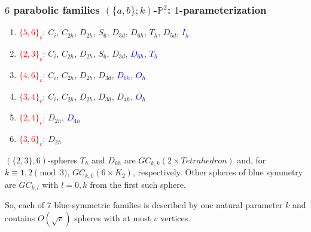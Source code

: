 \documentclass{beamer}
\begin{document}
\begin{frame}\frametitle{$6$ parabolic families  $(\{a, b\};k)$-$\mathbb{P}^2$:
$1$-parameterization}
\begin{enumerate}
\item
\textcolor{red}{$\{5,6\}_v$}:
$C_i$, $C_{2h}$, $D_{2h}$, $S_6$, $D_{3d}$, $D_{6h}$,  $T_h$, $D_{5d}$, 
\textcolor{blue}{$I_h$}
\item
\textcolor{red}{$\{2, 3\}_v$}:  $C_i$, $C_{2h}$,
  $D_{2h}$, $S_6$, $D_{3d}$, \textcolor{blue}{$D_{6h}$},   \textcolor{blue}{$T_h$}
\item
\textcolor{red}{$\{4,6\}_v$}:
$C_{i}$, $C_{2h}$, $D_{2h}$, $D_{3d}$, \textcolor{blue}{$D_{6h}$}, \textcolor{blue}{$O_h$}
\item
\textcolor{red}{$\{3, 4\}_v$}:
$C_i$, $C_{2h}$, $D_{2h}$, $D_{3d}$, $D_{4h}$,  \textcolor{blue}{$O_h$}
\item
\textcolor{red}{$\{2, 4\}_v$}: $D_{2h}$, 
\textcolor{blue}{$D_{4h}$}
\item
\textcolor{red}{$\{3,6\}_v$}: $D_{2h}$

\end{enumerate}
\vspace{2mm}
$(\{2, 3\},6)$-spheres $T_h$ and $D_{6h}$   are  
$GC_{k,k}(2\times Tetrahedron)$ and, for $k\equiv 1,2 \pmod 3$,  
$GC_{k,0}(6\times K_2)$, respectively.
Other spheres of blue symmetry are  $GC_{k,l}$ with $l=0,k$ from the first 
such sphere. 
\vspace{1mm}

So, each of $7$ blue-symmetric  families 
is described by one natural parameter $k$
and contains $O(\sqrt{v})$ spheres with at most $v$ vertices.


\end{frame}
\end{document}
